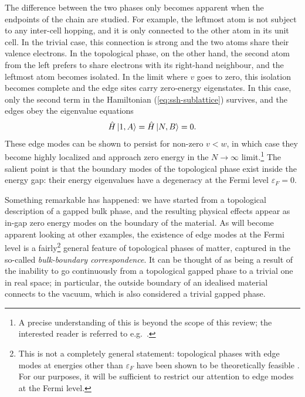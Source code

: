 The difference between the two phases only becomes apparent when the endpoints of the chain are studied. %
For example, the leftmost atom is not subject to any inter-cell hopping, and it is only connected to the other atom in its unit cell. In the trivial case, this connection is strong and the two atoms share their valence electrons. In the topological phase, on the other hand, the second atom from the left prefers to share electrons with its right-hand neighbour, and the leftmost atom becomes isolated. In the limit where $v$ goes to zero, this isolation becomes complete and the edge sites carry zero-energy eigenstates. In this case, only the second term in the Hamiltonian (\ref{eq:ssh-sublattice}) survives, and the edges obey the eigenvalue equations
\begin{align*}
	\hat{H}\ket{1,A} = \hat{H}\ket{N,B} = 0.
\end{align*}
These edge modes can be shown to persist for non-zero $v<w$, in which case they become highly localized and approach zero energy in the $N\to\infty$ limit.\footnote{
	A precise understanding of this is beyond the scope of this review; the interested reader is referred to e.g.\ \cite{Asboth_topo-course}.}
The salient point is that the boundary modes of the topological phase exist inside the energy gap: their energy eigenvalues have a degeneracy at the Fermi level $\varepsilon_F = 0$. 

Something remarkable has happened: we have started from a topological description of a gapped bulk phase, and the resulting physical effects appear as in-gap zero energy modes on the boundary of the material. As will become apparent looking at other examples, the existence of edge modes at the Fermi level is a fairly\footnote{
	This is not a completely general statement: topological phases with edge modes at energies other than $\varepsilon_F$ have been shown to be theoretically feasible \cite{Freedman_gapped-edge}. For our purposes, it will be sufficient to restrict our attention to edge modes at the Fermi level.}
general feature of topological phases of matter, captured in the so-called \emph{bulk-boundary correspondence}. It can be thought of as being a result of the inability to go continuously from a topological gapped phase to a trivial one in real space; in particular, the outside boundary of an idealised material connects to the vacuum, which is also considered a trivial gapped phase.

